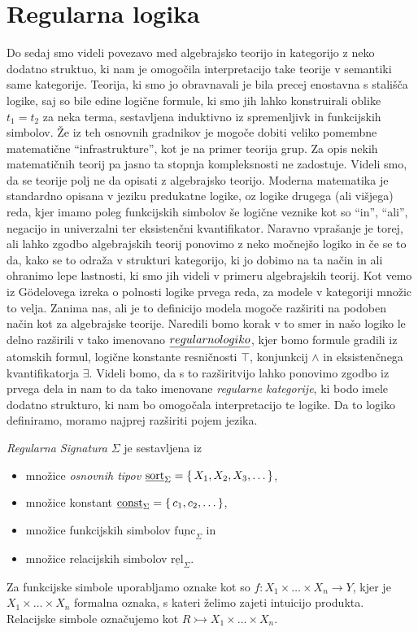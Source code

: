 \documentclass[../kategoricna_logika.tex]{subfiles}
\begin{document}
\section{Regularna logika}
Do sedaj smo videli povezavo med algebrajsko teorijo in kategorijo z neko dodatno struktuo, ki nam je omogočila interpretacijo take teorije v semantiki same kategorije. Teorija, ki smo jo obravnavali je bila precej enostavna s stališča logike, saj so bile edine logične formule, ki smo jih lahko konstruirali oblike $t_1 = t_2$ za neka terma, sestavljena induktivno iz spremenljivk in funkcijskih simbolov. 
Že iz teh osnovnih gradnikov je mogoče dobiti veliko pomembne matematične ``infrastrukture'', kot je na primer teorija grup. Za opis nekih matematičnih teorij pa jasno ta stopnja kompleksnosti ne zadostuje.
Videli smo, da se teorije polj ne da opisati z algebrajsko teorijo. Moderna matematika je standardno opisana v jeziku predukatne logike, oz logike drugega (ali višjega) reda, kjer imamo poleg funkcijskih simbolov še logične veznike kot so ``in'', ``ali'', negacijo in univerzalni ter eksistenčni kvantifikator.
Naravno vprašanje je torej, ali lahko zgodbo algebrajskih teorij ponovimo z neko močnejšo logiko in če se to da, kako se to odraža v strukturi kategorijo, ki jo dobimo na ta način in ali ohranimo lepe lastnosti, ki smo jih videli v primeru algebrajskih teorij.
Kot vemo iz Gödelovega izreka o polnosti logike prvega reda, za modele v kategoriji množic to velja. Zanima nas, ali je to definicijo modela mogoče razširiti na podoben način kot za algebrajske teorije.
Naredili bomo korak v to smer in našo logiko le delno razširili v tako imenovano $\emph{regularno logiko}$, kjer bomo formule gradili iz atomskih formul, logične konstante resničnosti $\top$, konjunkcij $\wedge$ in eksistenčnega kvantifikatorja $\exists$.
Videli bomo, da s to razširitvijo lahko ponovimo zgodbo iz prvega dela in nam to da tako imenovane \emph{regularne kategorije}, ki bodo imele dodatno strukturo, ki nam bo omogočala interpretacijo te logike.
Da to logiko definiramo, moramo najprej razširiti pojem jezika.
%
\begin{definicija}
\emph{Regularna Signatura} $\Sigma$ je sestavljena iz
\begin{itemize}
  \item množice \emph{osnovnih tipov} $\underline{\mathrm{sort}}_\Sigma = \left\lbrace\,X_1, X_2, X_3, \ldots\,\right\rbrace$,
  \item množice konstant $\underline{\mathrm{const}}_\Sigma = \left\lbrace\,c_1, c_2, \ldots\,\right\rbrace$,
  \item množice funkcijskih simbolov $\underline{\mathrm{func}}_\Sigma$ in
  \item množice relacijskih simbolov $\underline{\mathrm{rel}}_\Sigma$.
\end{itemize}
Za funkcijske simbole uporabljamo oznake kot so $f : X_1 \times \ldots \times X_n \to Y$,
kjer je $X_1 \times \ldots \times X_n$ formalna oznaka, s kateri želimo zajeti intuicijo produkta.
Relacijske simbole označujemo kot $R \rightarrowtail X_1 \times \ldots \times X_n$.
\end{definicija}
\end{document}
